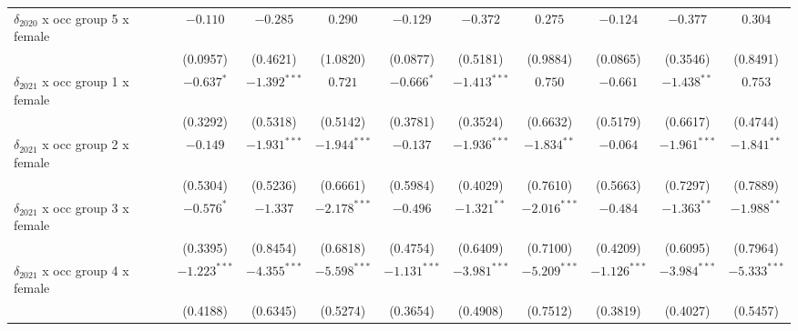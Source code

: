 \begin{tabular}{l|ccc|ccc|ccc}
$\delta_{2020}$ x occ group 5 x female &                $-0.110$ &        $-0.285$ &         $0.290$ &                 $-0.129$ &        $-0.372$ &         $0.275$ &                 $-0.124$ &        $-0.377$ &         $0.304$ \\
                                       &                (0.0957) &        (0.4621) &        (1.0820) &                 (0.0877) &        (0.5181) &        (0.9884) &                 (0.0865) &        (0.3546) &        (0.8491) \\
$\delta_{2021}$ x occ group 1 x female &              $-0.637^*$ &  $-1.392^{***}$ &         $0.721$ &               $-0.666^*$ &  $-1.413^{***}$ &         $0.750$ &                 $-0.661$ &   $-1.438^{**}$ &         $0.753$ \\
                                       &                (0.3292) &        (0.5318) &        (0.5142) &                 (0.3781) &        (0.3524) &        (0.6632) &                 (0.5179) &        (0.6617) &        (0.4744) \\
$\delta_{2021}$ x occ group 2 x female &                $-0.149$ &  $-1.931^{***}$ &  $-1.944^{***}$ &                 $-0.137$ &  $-1.936^{***}$ &   $-1.834^{**}$ &                 $-0.064$ &  $-1.961^{***}$ &   $-1.841^{**}$ \\
                                       &                (0.5304) &        (0.5236) &        (0.6661) &                 (0.5984) &        (0.4029) &        (0.7610) &                 (0.5663) &        (0.7297) &        (0.7889) \\
$\delta_{2021}$ x occ group 3 x female &              $-0.576^*$ &        $-1.337$ &  $-2.178^{***}$ &                 $-0.496$ &   $-1.321^{**}$ &  $-2.016^{***}$ &                 $-0.484$ &   $-1.363^{**}$ &   $-1.988^{**}$ \\
                                       &                (0.3395) &        (0.8454) &        (0.6818) &                 (0.4754) &        (0.6409) &        (0.7100) &                 (0.4209) &        (0.6095) &        (0.7964) \\
$\delta_{2021}$ x occ group 4 x female &          $-1.223^{***}$ &  $-4.355^{***}$ &  $-5.598^{***}$ &           $-1.131^{***}$ &  $-3.981^{***}$ &  $-5.209^{***}$ &           $-1.126^{***}$ &  $-3.984^{***}$ &  $-5.333^{***}$ \\
                                       &                (0.4188) &        (0.6345) &        (0.5274) &                 (0.3654) &        (0.4908) &        (0.7512) &                 (0.3819) &        (0.4027) &        (0.5457) \\

\end{tabular}
